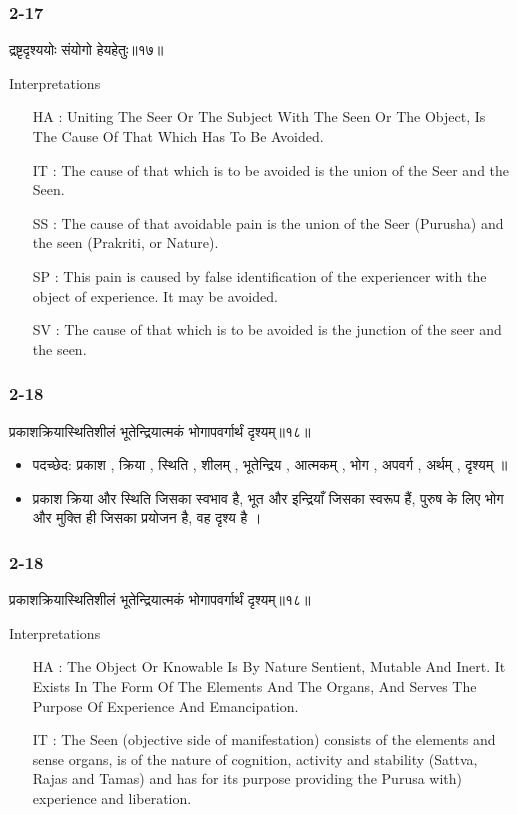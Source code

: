 \begin{frame}[fragile]\frametitle{2-17}
\begin{sanskrit}
द्रष्टृदृश्ययोः संयोगो हेयहेतुः॥१७॥
\end{sanskrit}

Interpretations
\begin{itemize}
\item [HA]: Uniting The Seer Or The Subject With The Seen Or The Object, Is The Cause Of That Which Has To Be Avoided.
\item [IT]: The cause of that which is to be avoided is the union of the Seer and the Seen.
\item [SS]: The cause of that avoidable pain is the union of the Seer (Purusha) and the seen (Prakriti, or Nature).
\item [SP]: This pain is caused by false identification of the experiencer with the object of experience. It may be avoided.
\item [SV]: The cause of that which is to be avoided is the junction of the seer and the seen. 
\end{itemize}
	
\end{frame}

\begin{frame}[fragile]\frametitle{2-18}
\begin{sanskrit}
प्रकाशक्रियास्थितिशीलं भूतेन्द्रियात्मकं भोगापवर्गार्थं दृश्यम्॥१८॥
\end{sanskrit}

\begin{itemize}
\item पदच्छेद: प्रकाश , क्रिया , स्थिति , शीलम् , भूतेन्द्रिय , आत्मकम् , भोग , अपवर्ग , अर्थम् , दृश्यम् ॥
\item प्रकाश क्रिया और स्थिति जिसका स्वभाव है, भूत और इन्द्रियाँ जिसका स्वरूप हैं, पुरुष के लिए भोग और मुक्ति ही जिसका प्रयोजन है, वह दृश्य है ।
\end{itemize}

\end{frame}

\begin{frame}[fragile]\frametitle{2-18}
\begin{sanskrit}
प्रकाशक्रियास्थितिशीलं भूतेन्द्रियात्मकं भोगापवर्गार्थं दृश्यम्॥१८॥
\end{sanskrit}

Interpretations
\begin{itemize}
\item [HA]: The Object Or Knowable Is By Nature Sentient, Mutable And Inert. It Exists In The Form Of The Elements And The Organs, And Serves The Purpose Of Experience And Emancipation.
\item [IT]: The Seen (objective side of manifestation) consists of the elements and sense organs, is of the nature of cognition, activity and stability (Sattva, Rajas and Tamas) and has for its purpose providing the Purusa with) experience and liberation.		
\end{itemize}
\end{frame}

